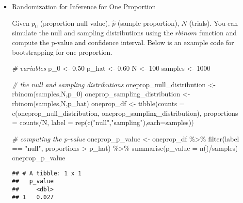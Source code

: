 \documentclass[
]{article}
\newenvironment{Shaded}{\begin{snugshade}}{\end{snugshade}}
\newcommand{\AttributeTok}[1]{\textcolor[rgb]{0.77,0.63,0.00}{#1}}
\newcommand{\CommentTok}[1]{\textcolor[rgb]{0.56,0.35,0.01}{\textit{#1}}}
\newcommand{\DecValTok}[1]{\textcolor[rgb]{0.00,0.00,0.81}{#1}}
\newcommand{\FloatTok}[1]{\textcolor[rgb]{0.00,0.00,0.81}{#1}}
\newcommand{\FunctionTok}[1]{\textcolor[rgb]{0.00,0.00,0.00}{#1}}
\newcommand{\NormalTok}[1]{#1}
\newcommand{\OtherTok}[1]{\textcolor[rgb]{0.56,0.35,0.01}{#1}}
\newcommand{\SpecialCharTok}[1]{\textcolor[rgb]{0.00,0.00,0.00}{#1}}
\newcommand{\StringTok}[1]{\textcolor[rgb]{0.31,0.60,0.02}{#1}}
\begin{document}
\begin{itemize}
\item
  Randomization for Inference for One Proportion

  Given \(p_0\) (proportion null value), \(\hat{p}\) (sample proportion), \(N\) (trials). You can simulate the null and sampling distributions using the \(rbinom\) function and compute the p-value and confidence interval. Below is an example code for bootstrapping for one proportion.

\begin{Shaded}
\begin{Highlighting}[]
\CommentTok{\# variables}
\NormalTok{p\_0 }\OtherTok{\textless{}{-}} \FloatTok{0.50}
\NormalTok{p\_hat }\OtherTok{\textless{}{-}} \FloatTok{0.60}
\NormalTok{N }\OtherTok{\textless{}{-}} \DecValTok{100}
\NormalTok{samples }\OtherTok{\textless{}{-}} \DecValTok{1000}

\CommentTok{\# the null and sampling distributions}
\NormalTok{oneprop\_null\_distribution }\OtherTok{\textless{}{-}} \FunctionTok{rbinom}\NormalTok{(samples,N,p\_0)}
\NormalTok{oneprop\_sampling\_distribution }\OtherTok{\textless{}{-}} \FunctionTok{rbinom}\NormalTok{(samples,N,p\_hat)}
\NormalTok{oneprop\_df }\OtherTok{\textless{}{-}} \FunctionTok{tibble}\NormalTok{(}\AttributeTok{counts =} \FunctionTok{c}\NormalTok{(oneprop\_null\_distribution,}
\NormalTok{                                oneprop\_sampling\_distribution),}
                     \AttributeTok{proportions =}\NormalTok{ counts}\SpecialCharTok{/}\NormalTok{N,}
                     \AttributeTok{label =} \FunctionTok{rep}\NormalTok{(}\FunctionTok{c}\NormalTok{(}\StringTok{"null"}\NormalTok{,}\StringTok{"sampling"}\NormalTok{),}\AttributeTok{each=}\NormalTok{samples))}

\CommentTok{\# computing the p{-}value}
\NormalTok{oneprop\_p\_value }\OtherTok{\textless{}{-}}\NormalTok{ oneprop\_df }\SpecialCharTok{\%\textgreater{}\%}
  \FunctionTok{filter}\NormalTok{(label }\SpecialCharTok{==} \StringTok{"null"}\NormalTok{,}
\NormalTok{         proportions }\SpecialCharTok{\textgreater{}}\NormalTok{ p\_hat) }\SpecialCharTok{\%\textgreater{}\%}
  \FunctionTok{summarise}\NormalTok{(}\AttributeTok{p\_value =} \FunctionTok{n}\NormalTok{()}\SpecialCharTok{/}\NormalTok{samples)}
\NormalTok{oneprop\_p\_value}
\end{Highlighting}
\end{Shaded}

\begin{verbatim}
## # A tibble: 1 x 1
##   p_value
##     <dbl>
## 1   0.027
\end{verbatim}


\end{itemize}
\end{document}
